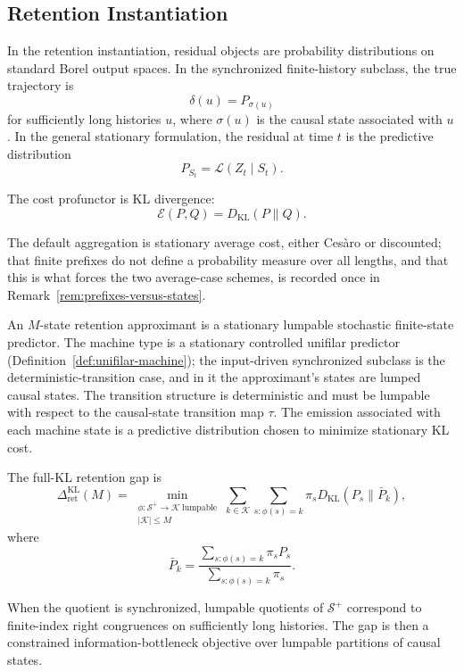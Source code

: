 \documentclass[12pt]{article}
\theoremstyle{definition}
\newcommand{\RetKL}{\Delta_{\mathrm{ret}}^{\mathrm{KL}}}
\newcommand{\Splus}{\mathcal S^{+}}
\begin{document}
\subsection{Retention Instantiation}
\label{subsec:retention-instantiation}

In the retention instantiation, residual objects are probability distributions
on standard Borel output spaces.  In the synchronized finite-history subclass,
the true trajectory is
\[
\delta(u)=P_{\sigma(u)}
\]
for sufficiently long histories $u$, where $\sigma(u)$ is the causal state
associated with $u$.  In the general stationary formulation, the residual at
time $t$ is the predictive distribution
\[
P_{S_t}
=
\mathcal L(Z_t\mid S_t).
\]

The cost profunctor is KL divergence:
\[
\mathcal E(P,Q)=D_{\mathrm{KL}}(P\|Q).
\]

The default aggregation is stationary average cost, either Ces\`aro or
discounted; that finite prefixes do not define a probability measure over all
lengths, and that this is what forces the two average-case schemes, is
recorded once in Remark~\ref{rem:prefixes-versus-states}.

An $M$-state retention approximant is a stationary lumpable stochastic
finite-state predictor.  The machine type is a stationary controlled unifilar
predictor (Definition~\ref{def:unifilar-machine}); the input-driven
synchronized subclass is the deterministic-transition case, and in it the
approximant's states are lumped causal states.  The transition structure is deterministic and must be lumpable
with respect to the causal-state transition map $\tau$.  The emission
associated with each machine state is a predictive distribution chosen to
minimize stationary KL cost.

The full-KL retention gap is
\[
\RetKL(M)
=
\min_{\substack{
\phi:\Splus\to\mathcal K\ \text{lumpable}\\
|\mathcal K|\le M
}}
\sum_{k\in\mathcal K}
\sum_{s:\phi(s)=k}
\pi_s
D_{\mathrm{KL}}(P_s\|\bar P_k),
\]
where
\[
\bar P_k
=
\frac{
\sum_{s:\phi(s)=k}\pi_s P_s
}{
\sum_{s:\phi(s)=k}\pi_s
}.
\]

When the quotient is synchronized, lumpable quotients of $\Splus$ correspond
to finite-index right congruences on sufficiently long histories.  The gap is
then a constrained information-bottleneck objective over lumpable partitions
of causal states.
\end{document}
